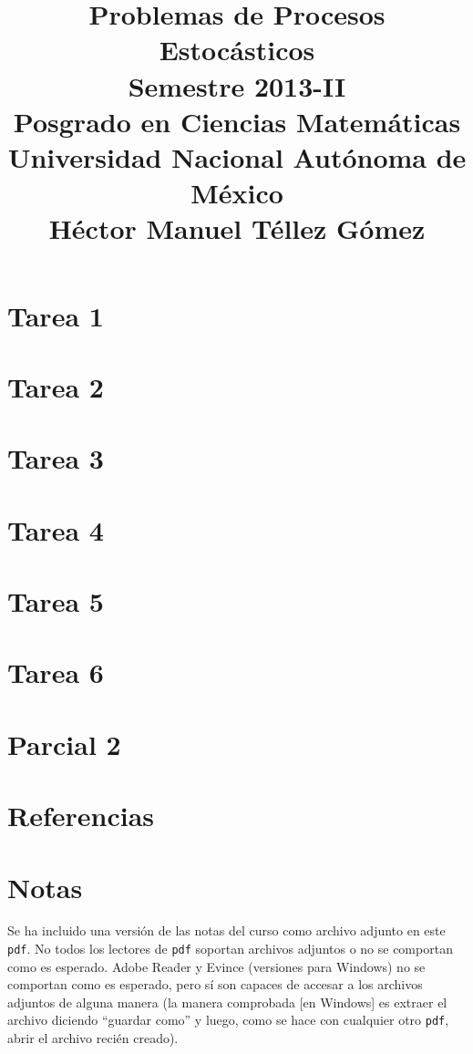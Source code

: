 \documentclass[a5paper,oneside]{amsart}
\title[Tarea de procesos estocásticos 2013-2]{
    Problemas de Procesos Estocásticos\\ 
    Semestre 2013-II\\ 
    Posgrado en Ciencias Matemáticas\\ 
    Universidad Nacional Autónoma de México\\
    Héctor Manuel Téllez Gómez
}
\theoremstyle{definition}
\numberwithin{section}{part}
\numberwithin{equation}{subsection}
\begin{document}
    \maketitle
    \part{Tarea 1}
                
        \nqed
        
    \part{Tarea 2}
                
        \nqed
        
    \part{Tarea 3}
                
        \nqed
            
    \part{Tarea 4}
                
        \nqed    
    
    \part{Tarea 5}
                
        \nqed
    
    \part{Tarea 6}
                
        \nqed

    \part{Parcial 2}
        
        \pn
        \nqed
    
    \part*{Referencias}
        
        
        \newpage

        
        
    \part*{Notas}\label{notas}
        Se ha incluido una versión de las notas del curso como archivo adjunto en este \texttt{pdf}. No todos los lectores de \texttt{pdf} soportan 
        archivos adjuntos o no se comportan como es esperado. Adobe Reader y Evince (versiones para Windows) no se comportan como es esperado, 
        pero sí son capaces de accesar a los archivos adjuntos de alguna manera (la manera comprobada [en Windows] es extraer el archivo diciendo 
        ``guardar como'' y luego, como se hace con cualquier otro \texttt{pdf}, abrir el archivo recién creado).\pn
        
\end{document}
